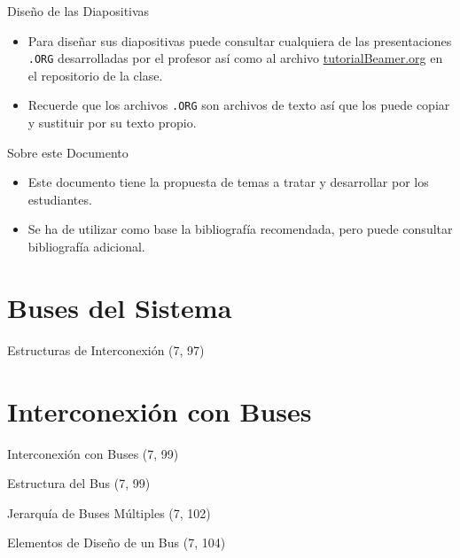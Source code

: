 \documentclass[presentation]{beamer}
\begin{document}
\begin{frame}[label={sec:orga9b299c},fragile]{Diseño de las Diapositivas}
 \begin{itemize}
\item Para diseñar sus diapositivas puede consultar cualquiera de las
presentaciones \texttt{.ORG} desarrolladas por el profesor así como al
archivo \href{https://github.com/LeninGF/EPN-Lectures/blob/main/iccd332ArqComp-2024-B/Tutoriales/Beamer-Emacs/tutorialBeamer.org}{tutorialBeamer.org} en el repositorio de la clase.
\item Recuerde que los archivos \texttt{.ORG} son archivos de texto así que los
puede copiar y sustituir por su texto propio.
\end{itemize}
\end{frame}
\begin{frame}[label={sec:orgb2b5550}]{Sobre este Documento}
\begin{itemize}
\item Este documento tiene la propuesta de temas a tratar y desarrollar
por los estudiantes.
\item Se ha de utilizar como base la bibliografía recomendada, pero puede
consultar bibliografía adicional.
\end{itemize}
\end{frame}
\section{Buses del Sistema}
\label{sec:org57abc5d}
\begin{frame}[label={sec:org4671a2b}]{Estructuras de Interconexión (7, 97)}
\end{frame}
\section{Interconexión con Buses}
\label{sec:orgf9ff483}
\begin{frame}[label={sec:org7eeca4a}]{Interconexión con Buses (7, 99)}
\end{frame}
\begin{frame}[label={sec:org6f6583d}]{Estructura del Bus  (7, 99)}
\end{frame}
\begin{frame}[label={sec:orga9b7937}]{Jerarquía de Buses Múltiples (7, 102)}
\end{frame}
\begin{frame}[label={sec:org05e0997}]{Elementos de Diseño de un Bus (7, 104)}
\end{frame}
\end{document}
